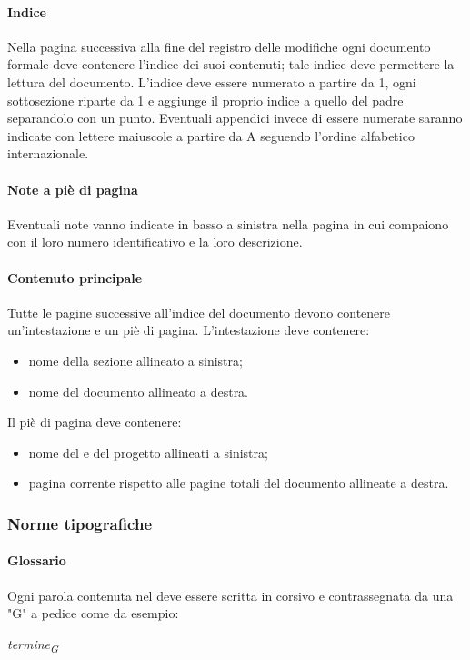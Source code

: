                 \paragraph{Indice}
                Nella pagina successiva alla fine del registro delle modifiche ogni documento formale deve contenere l'indice dei suoi contenuti; tale indice deve permettere la lettura  del documento. L'indice deve essere numerato a partire da 1, ogni sottosezione riparte da 1 e aggiunge il proprio indice a quello del padre separandolo con un punto. Eventuali appendici invece di essere numerate saranno indicate con lettere maiuscole a partire da A seguendo l'ordine alfabetico internazionale.
                \paragraph{Note a piè di pagina}
                Eventuali note vanno indicate in basso a sinistra nella pagina in cui compaiono con il loro numero identificativo e la loro descrizione.
                \paragraph{Contenuto principale}
                Tutte le pagine successive all'indice del documento devono contenere un'intestazione e un piè di pagina.
                L'intestazione deve contenere:
                \begin{itemize}
                    \item nome della sezione allineato a sinistra;
                    \item nome del documento allineato a destra.
                \end{itemize}
                Il piè di pagina deve contenere:
                \begin{itemize}
                    \item nome del  e del progetto allineati a sinistra;
                    \item pagina corrente rispetto alle pagine totali del documento allineate a destra.
                \end{itemize}
        \subsubsection{Norme tipografiche}
                \paragraph{Glossario}
                Ogni parola contenuta nel \gl{} deve essere scritta in corsivo e contrassegnata da una "G" a pedice come da esempio:\\
                \centerline{\textit{termine\textsubscript{G}}}
